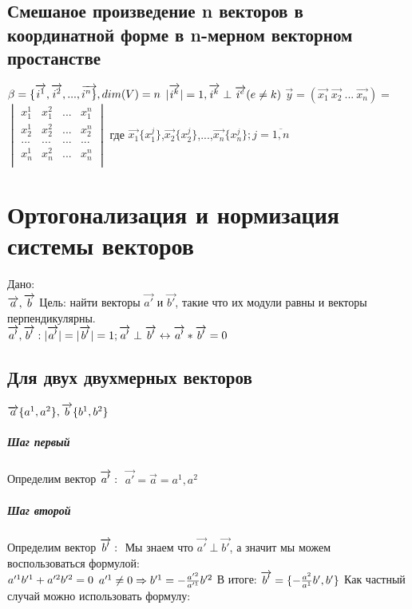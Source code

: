 \documentclass{book}
\begin{document}
\section{Смешаное произведение n векторов в координатной форме в n-мерном векторном простанстве}
$\beta=\{\overrightarrow{i^1},\overrightarrow{i^2},...,\overrightarrow{i^n\}}, dim(V)=n\\$
$|\overrightarrow{i^k}|=1, \overrightarrow{i^k} \perp \overrightarrow{i^e} (e \neq k)\\$
$\overrightarrow{y}=(\overrightarrow{x_1}\ \overrightarrow{x_2}\ ...\ \overrightarrow{x_{n}})=$
$\begin{vmatrix}
    x_1^1 & x_1^2 & ... & x_1^n\\
    x_2^1 & x_2^2 & ... & x_2^n\\
    ... & ... & ... & ...\\
    x_{n}^1 & x_{n}^2 & ... & x_{n}^n\\
\end{vmatrix}$ где $\overrightarrow{x_1}\{x^j_1\}$,$\overrightarrow{x_2}\{x^j_2\}$,...,$\overrightarrow{x_{n}}\{x^j_{n}\}; j=\overline{1,n}$
\chapter{Ортогонализация и нормизация системы векторов}
Дано:\\
$\overrightarrow{a},\overrightarrow{b}\\$
Цель: найти векторы $\overrightarrow{a'}$ и $\overrightarrow{b'}$, такие что их модули равны и векторы перпендикулярны.\\
$\overrightarrow{a'},\overrightarrow{b'} : |\overrightarrow{a'}|=|\overrightarrow{b'}|=1;\overrightarrow{a'}\perp\overrightarrow{b'} \leftrightarrow \overrightarrow{a'}*\overrightarrow{b'}=0\\$
\section{Для двух двухмерных векторов}
$\overrightarrow{a}\{a^1,a^2\}, \overrightarrow{b}\{b^1,b^2\}\\$
\paragraph*{Шаг первый}
Определим вектор $\overrightarrow{a'}:\\$
$\overrightarrow{a'}=\overrightarrow{a}={a^1,a^2}$
\paragraph*{Шаг второй}
Определим вектор $\overrightarrow{b'}:\\$
Мы знаем что $\overrightarrow{a'}\perp\overrightarrow{b'}$, а значит мы можем воспользоваться формулой:\\
$a'^1b'^1+a'^2b'^2=0\\$
$a'^1\neq0 \Rightarrow b'^1=-\frac{a'^2}{a'^1}b'^2\\$
В итоге: $\overrightarrow{b'}=\{-\frac{a^2}{a^1}b',b'\}\\$
Как частный случай можно использовать формулу:
\end{document}
